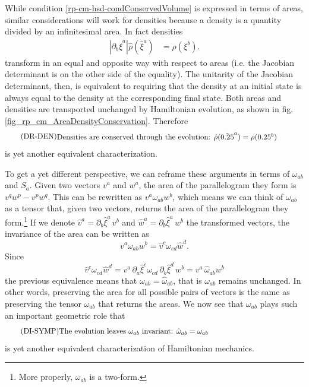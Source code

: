 While condition \ref{rp-cm-hsd-condConservedVolume} is expressed in terms of areas, similar considerations will work for densities because a density is a quantity divided by an infinitesimal area. In fact densities
\begin{equation}\label{rp-cm-densityTransformation1d}
	\begin{aligned}
		\left| \partial_b \hat{\xi}^a \right| \hat{\rho}(\hat{\xi}^a) &= \rho(\xi^b).
	\end{aligned}	
\end{equation}
transform in an equal and opposite way with respect to areas (i.e. the Jacobian determinant is on the other side of the equality). The unitarity of the Jacobian determinant, then, is equivalent to requiring that the density at an initial state is always equal to the density at the corresponding final state. Both areas and densities are transported unchanged by Hamiltonian evolution, as shown in fig. \ref{fig_rp_cm_AreaDensityConservation}. Therefore
\begin{equation}\label{rp-cm-hsd-condConservedDensity}
	\tag{DR-DEN}
	\eqtext{Densities are conserved through the evolution: $\hat{\rho}(\hat{\xi}^a) = \rho(\xi^b)$ } 
\end{equation}
is yet another equivalent characterization.

To get a yet different perspective, we can reframe these arguments in terms of $\omega_{ab}$ and $S_a$. Given two vectors $v^a$ and $w^a$, the area of the parallelogram they form is $v^q w^p - v^p w^q$. This can be rewritten as $v^a \omega_{ab} w^b$, which means we can think of $\omega_{ab}$ as a tensor that, given two vectors, returns the area of the parallelogram they form.\footnote{More properly, $\omega_{ab}$ is a two-form.} If we denote $\hat{v}^a = \partial_b \hat{\xi}^a \, v^b$ and $\hat{w}^a = \partial_b \hat{\xi}^a \, w^b$ the transformed vectors, the invariance of the area can be written as
\begin{equation}
	v^a \omega_{ab} w^b = \hat{v}^c \omega_{cd} \hat{w}^d.
\end{equation}
Since
\begin{equation}
	\hat{v}^c \omega_{cd} \hat{w}^d = v^a \, \partial_a \hat{\xi}^c \omega_{cd} \, \partial_b \hat{\xi}^d \, w^b = v^a \, \hat{\omega}_{ab} w^b
\end{equation}
the previous equivalence means that $\omega_{ab} = \hat{\omega}_{ab}$, that is $\omega_{ab}$ remains unchanged. In other words, preserving the area for all possible pairs of vectors is the same as preserving the tensor $\omega_{ab}$ that returns the areas. We now see that $\omega_{ab}$ plays such an important geometric role that
\begin{equation}\label{rp-cm-hsd-condConservedSymplectic}
	\tag{DI-SYMP}
	\eqtext{The evolution leaves $\omega_{ab}$ invariant: $\hat{\omega}_{ab} = \omega_{ab}$} 
\end{equation}
is yet another equivalent characterization of Hamiltonian mechanics.

